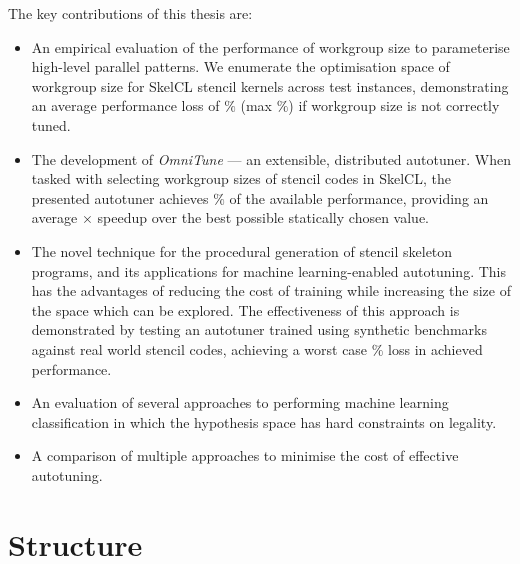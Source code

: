 The key contributions of this thesis are:

\begin{itemize}
\item An empirical evaluation of the performance of workgroup size to
  parameterise high-level parallel patterns. We enumerate the
  optimisation space of workgroup size for SkelCL stencil kernels
  across  test instances, demonstrating
  an average performance loss of
  $\%$ (max
  $\%$) if workgroup size is not
  correctly tuned. 
\item The development of \emph{OmniTune} --- an extensible,
  distributed autotuner. When tasked with selecting workgroup sizes of
  stencil codes in SkelCL, the presented autotuner achieves
  $\%$ of the available
  performance, providing an average
  $\times$ speedup over the
  best possible statically chosen value.
\item The novel technique for the procedural generation of stencil
  skeleton programs, and its applications for machine learning-enabled
  autotuning. This has the advantages of reducing the cost of training
  while increasing the size of the space which can be explored. The
  effectiveness of this approach is demonstrated by testing an
  autotuner trained using synthetic benchmarks against
   real world stencil codes, achieving a
  worst case
  $\%$
  loss in achieved performance.
\item An evaluation of several approaches to performing machine
  learning classification in which the hypothesis space has hard
  constraints on legality.
\item A comparison of multiple approaches to minimise the cost of
  effective autotuning. 
\end{itemize}

\section{Structure}

